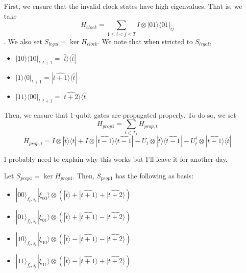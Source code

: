 \documentclass{article}
\theoremstyle{definition}
\begin{document}
First, we ensure that the invalid clock states have high eigenvalues. That is, we take $$H_{clock}=\sum_{1\leq i<j\leq T} I\otimes |01\rangle\langle01|_{ij}$$. We also set $S_{legal}=\ker H_{clock}$.
We note that when stricted to $S_{legal}$, 
\begin{itemize}
	\item $|10\rangle\langle10|_{t,t+1}
		=|\widehat{t}\rangle\langle\widehat{t}|$ 
	\item $|1\rangle\langle0|_{t+1}
		=|\widehat{t+1}\rangle\langle\widehat{t}|$
	\item $|11\rangle\langle00|_{t,t+1}
		=|\widehat{t+2}\rangle\langle\widehat{t}|$
\end{itemize}

Then, we ensure that 1-qubit gates are propagated properly. To do so, we set
	$$H_{prop1}=\sum_{t\in T_1}H_{prop,t}$$
	$$H_{prop,t}=I\otimes|\widehat{t}\rangle\langle\widehat{t}|
		+I\otimes|\widehat{t-1}\rangle\langle\widehat{t-1}|
		-U_t\otimes|\widehat{t}\rangle\langle\widehat{t-1}|
		-U_t^\dagger\otimes|\widehat{t-1}\rangle\langle\widehat{t}|$$

I probably need to explain why this works but I'll leave it for another day.

Let $S_{prop1}=\ker H_{prop1}$.
Then, $S_{prop1}$ has the following as basis:
\begin{itemize}
	\item $|00\rangle_{f_t,s_t}|\xi_{00}\rangle\otimes
		(|\widehat{t}\rangle+|\widehat{t+1}\rangle+|\widehat{t+2}\rangle)$
	\item $|01\rangle_{f_t,s_t}|\xi_{01}\rangle\otimes
		(|\widehat{t}\rangle+|\widehat{t+1}\rangle-|\widehat{t+2}\rangle)$
	\item $|10\rangle_{f_t,s_t}|\xi_{10}\rangle\otimes
		(|\widehat{t}\rangle-|\widehat{t+1}\rangle-|\widehat{t+2}\rangle)$
	\item $|11\rangle_{f_t,s_t}|\xi_{11}\rangle\otimes
		(|\widehat{t}\rangle-|\widehat{t+1}\rangle+|\widehat{t+2}\rangle)$
\end{itemize}
\end{document}
